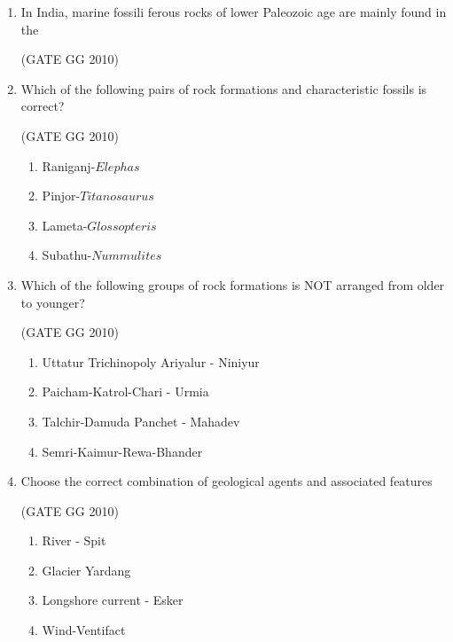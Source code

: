 \documentclass[journal]{IEEEtran}
\begin{document}
\begin{enumerate}
\item In India, marine fossili ferous rocks of lower Paleozoic age are mainly found in the

\hfill (GATE GG 2010)

\begin{enumerate}
\end{enumerate}

\item Which of the following pairs of rock formations and characteristic fossils is correct?

\hfill (GATE GG 2010)
\begin{multicols}{2}

\begin{enumerate}
    \item Raniganj-$Elephas$
    \item Pinjor-$Titanosaurus$
    \item Lameta-$Glossopteris$
    \item Subathu-$Nummulites$
\end{enumerate}
\end{multicols}

\item Which of the following groups of rock formations is NOT arranged from older to younger?

\hfill (GATE GG 2010) 

\begin{enumerate}
    \item Uttatur Trichinopoly Ariyalur - Niniyur
    \item Paicham-Katrol-Chari - Urmia
    \item Talchir-Damuda Panchet - Mahadev
    \item Semri-Kaimur-Rewa-Bhander
\end{enumerate}

\item Choose the correct combination of geological agents and associated features

\hfill (GATE GG 2010) 
\begin{multicols}{2}

\begin{enumerate}
    \item River - Spit
    \item Glacier Yardang
    \item Longshore current - Esker
    \item Wind-Ventifact
\end{enumerate}
\end{multicols}


\end{enumerate}
\end{document}
